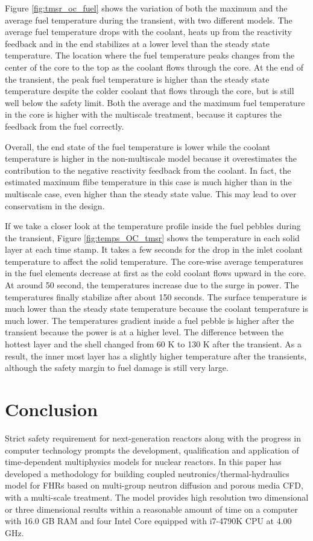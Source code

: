 \documentclass{elsarticle}
\begin{document}
Figure \ref{fig:tmsr_oc_fuel} shows the variation of both the maximum and the average fuel temperature during the transient, with two different models.
The average fuel temperature drops with the coolant, heats up from the reactivity feedback and in the end stabilizes at a lower level than the steady state temperature.
The location where the fuel temperature peaks changes from the center of the core to the top as the coolant flows through the core. At the end of the transient, the peak fuel temperature is higher than the steady state temperature despite the colder coolant that flows through the core, but is still well below the safety limit. 
Both the average and the maximum fuel temperature in the core is higher with the multiscale treatment, because it captures the feedback from the fuel correctly. 

Overall, the end state of the fuel temperature is lower while the coolant temperature is higher in the non-multiscale model because it overestimates the contribution to the negative reactivity feedback from the coolant. 
In fact, the estimated maximum flibe temperature in this case is much higher than in the multiscale case, even higher than the steady state value. This may lead to over conservatism in the design. 


If we take a closer look at the temperature profile inside the fuel pebbles during the transient, Figure \ref{fig:temps_OC_tmsr} shows the temperature in each solid layer at each time stamp.
It takes a few seconds for the drop in the inlet coolant temperature to affect the solid temperature. The core-wise average temperatures in the fuel elements decrease at first as the cold coolant flows upward in the core.
At around 50 second, the temperatures increase due to the surge in power. The temperatures finally stabilize after about 150 seconds. The surface temperature is much lower than the steady state temperature because the coolant temperature is much lower.
The temperatures gradient inside a fuel pebble is higher after the transient because the power is at a higher level. The difference between the hottest layer and the shell changed from 60 K to 130 K after the transient. As a result, the inner most layer has a slightly higher temperature after the transients, although the safety margin to fuel damage is still very large. 


\section{Conclusion}
Strict safety requirement for next-generation reactors along with the progress in computer technology prompts the development, qualification and application of time-dependent multiphysics models for nuclear reactors.
In this paper has developed a methodology for building coupled neutronics/thermal-hydraulics model for FHRs based on multi-group neutron diffusion and porous media CFD, with a multi-scale treatment. The model provides high resolution two dimensional or three dimensional results within a reasonable amount of time on a computer with 16.0 GB RAM and four Intel Core equipped with i7-4790K CPU at 4.00 GHz.
\end{document}
